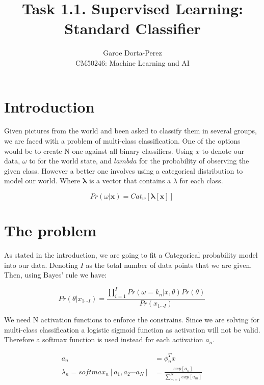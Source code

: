 \documentclass[12pt]{article}
\begin{document}
  
\title{Task 1.1. Supervised Learning: Standard Classifier}
\author{Garoe Dorta-Perez\\
CM50246: Machine Learning and AI}
 
\maketitle
 
\section{Introduction}
 
Given pictures from the world and been asked to classify them in several groups, we are faced with a problem of multi-class classification.
One of the options would be to create N one-against-all binary classifiers. Using $x$ to denote our data, $\omega$ to for the world state, and $lambda$ for the probability of observing the given class. However a better one involves using a categorical distribution to model our world. Where $\bm{\lambda}$ is a vector that contains a $\lambda$ for each class.

\begin{equation}
\label{categoricalDistribution}
Pr(\omega|\mathbf{x}) = Cat_{w}[\bm{\lambda}[\mathbf{x}]]\,
\end{equation}

\section{The problem}

As stated in the introduction, we are going to fit a Categorical probability model into our data. 
Denoting $I$ as the total number of data points that we are given.  
Then, using Bayes' rule we have:

\begin{equation}
\label{bayes}
Pr(\theta | x_{1 \cdots I}) = \frac{\prod_{i = 1}^{I} Pr(\omega = k_{n} | x, \theta) Pr(\theta)} {Pr(x_{1 \cdots I})}\,
\end{equation}

We need N activation functions to enforce the constrains.
Since we are solving for multi-class classification a logistic sigmoid function as activation will not be valid.
Therefore a softmax function is used instead for each activation $a_{n}$.

\begin{align}
\label{activations}
a_{n} &= \phi_{n}^{T}x \\
\lambda_{n} = softmax_{n}[a_{1}, a_{2} \cdots a_{N}] &= 
\frac{exp[a_{n}]} {\sum_{m = 1}^{N} exp[a_{m}] }\,
\end{align}
\end{document}
